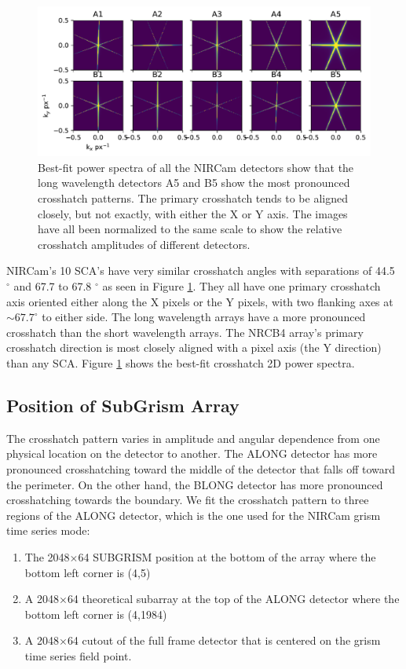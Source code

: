 \documentclass[]{aastex62}
\newcommand{\degree}{^\circ}
\begin{document}
\begin{figure}[!hbtp]
\centering
\includegraphics[width=.99\columnwidth]{psd_models_gallery.pdf}
\caption{
Best-fit power spectra of all the NIRCam detectors show that the long wavelength detectors A5 and B5 show the most pronounced crosshatch patterns.
The primary crosshatch tends to be aligned closely, but not exactly, with either the X or Y axis.
The images have all been normalized to the same scale to show the relative crosshatch amplitudes of different detectors.
}\label{fig:crosshatchModelGallery}
\end{figure}

NIRCam's 10 SCA's have very similar crosshatch angles with separations of 44.5 $\degree$ and 67.7 to 67.8 $\degree$ as seen in Figure \ref{fig:crosshatchModelGallery}.
They all have one primary crosshatch axis oriented either along the X pixels or the Y pixels, with two flanking axes at $\sim 67.7 \degree$ to either side.
The long wavelength arrays have a more pronounced crosshatch than the short wavelength arrays.
The NRCB4 array's primary crosshatch direction is most closely aligned with a pixel axis (the Y direction) than any SCA.
Figure \ref{fig:crosshatchModelGallery} shows the best-fit crosshatch 2D power spectra.


\subsection{Position of SubGrism Array}

The crosshatch pattern varies in amplitude and angular dependence from one physical location on the detector to another.
The ALONG detector has more pronounced crosshatching toward the middle of the detector that falls off toward the perimeter.
On the other hand, the BLONG detector has more pronounced crosshatching towards the boundary.
We fit the crosshatch pattern to three regions of the ALONG detector, which is the one used for the NIRCam grism time series mode:
\begin{enumerate}
	\item The 2048$\times$64 SUBGRISM position at the bottom of the array where the bottom left corner is (4,5) \label{subgrism64pos}
	\item A 2048$\times$64 theoretical subarray at the top of the ALONG detector where the bottom left corner is (4,1984)
	\item A 2048$\times$64 cutout of the full frame detector that is centered on the grism time series field point.
\end{enumerate}
\end{document}
